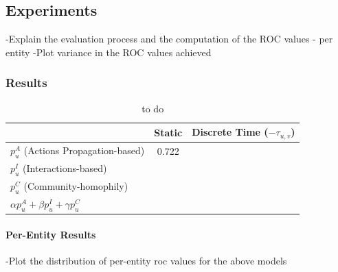 \documentclass[journal,10pt,draftclsnofoot,onecolumn]{IEEEtran}
\begin{document}
\subsection{Experiments}
-Explain the evaluation process and the computation of the ROC values - per entity
-Plot variance in the ROC values achieved

\subsubsection{Results}

\begin{table}
\begin{center}
\caption{to do}
\begin{tabular}{ l c c}
\hline
 & Static & Discrete Time ($-\tau_{u,v}$) \\
\hline
$p_{u}^{A}$ (Actions Propagation-based) & 0.722 & \\
$p_{u}^{I}$ (Interactions-based) & & \\
$p_{u}^{C}$ (Community-homophily) & & \\
$\alpha p_{u}^{A} + \beta p_{u}^{I}  + \gamma p_{u}^{C}$ & & \\
\hline
\end{tabular}
\label{tab:ml_datasets}
\end{center}
\end{table}

\paragraph{Per-Entity Results}
-Plot the distribution of per-entity roc values for the above models




%
\end{document}
